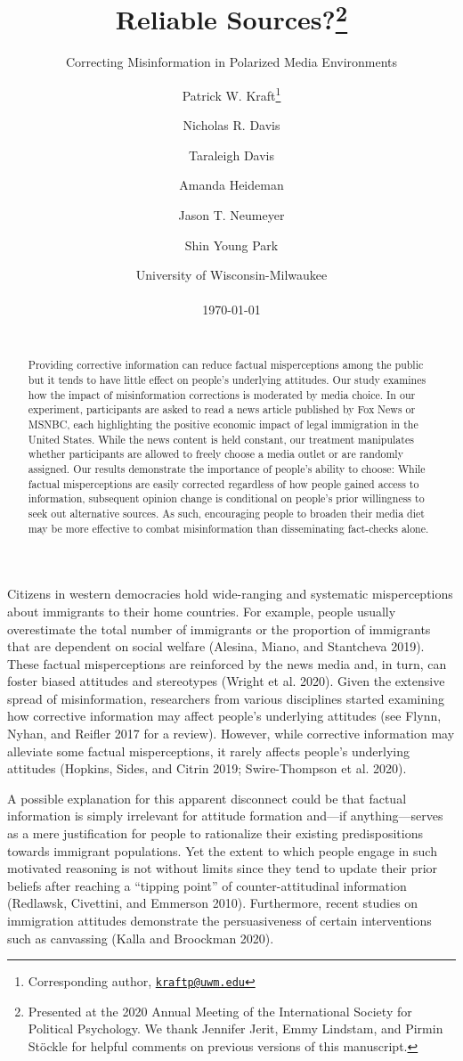 \documentclass[
  12pt,
]{article}
\title{Reliable Sources?\footnote{Presented at the 2020 Annual Meeting
  of the International Society for Political Psychology. We thank
  Jennifer Jerit, Emmy Lindstam, and Pirmin Stöckle for helpful comments
  on previous versions of this manuscript.}}
\subtitle{Correcting Misinformation in Polarized Media Environments
\vspace{1em}}
\author{Patrick W. Kraft\footnote{Corresponding author,
  \href{mailto:kraftp@uwm.edu}{\nolinkurl{kraftp@uwm.edu}}} \and Nicholas
R. Davis \and Taraleigh Davis \and Amanda Heideman \and Jason T.
Neumeyer \and Shin Young Park}
\date{\hfill\break
University of Wisconsin-Milwaukee\\
~\\
\today\\
~\\}
\begin{document}
\maketitle
\begin{abstract}
\noindent Providing corrective information can reduce factual
misperceptions among the public but it tends to have little effect on
people's underlying attitudes. Our study examines how the impact of
misinformation corrections is moderated by media choice. In our
experiment, participants are asked to read a news article published by
Fox News or MSNBC, each highlighting the positive economic impact of
legal immigration in the United States. While the news content is held
constant, our treatment manipulates whether participants are allowed to
freely choose a media outlet or are randomly assigned. Our results
demonstrate the importance of people's ability to choose: While factual
misperceptions are easily corrected regardless of how people gained
access to information, subsequent opinion change is conditional on
people's prior willingness to seek out alternative sources. As such,
encouraging people to broaden their media diet may be more effective to
combat misinformation than disseminating fact-checks alone.
\end{abstract}

\thispagestyle{empty}
\clearpage
\setcounter{page}{1}
\doublespace

\noindent Citizens in western democracies hold wide-ranging and
systematic misperceptions about immigrants to their home countries. For
example, people usually overestimate the total number of immigrants or
the proportion of immigrants that are dependent on social welfare
(Alesina, Miano, and Stantcheva 2019). These factual misperceptions are
reinforced by the news media and, in turn, can foster biased attitudes
and stereotypes (Wright et al. 2020). Given the extensive spread of
misinformation, researchers from various disciplines started examining
how corrective information may affect people's underlying attitudes (see
Flynn, Nyhan, and Reifler 2017 for a review). However, while corrective
information may alleviate some factual misperceptions, it rarely affects
people's underlying attitudes (Hopkins, Sides, and Citrin 2019;
Swire-Thompson et al. 2020).

A possible explanation for this apparent disconnect could be that
factual information is simply irrelevant for attitude formation and---if
anything---serves as a mere justification for people to rationalize
their existing predispositions towards immigrant populations. Yet the
extent to which people engage in such motivated reasoning is not without
limits since they tend to update their prior beliefs after reaching a
``tipping point'' of counter-attitudinal information (Redlawsk,
Civettini, and Emmerson 2010). Furthermore, recent studies on
immigration attitudes demonstrate the persuasiveness of certain
interventions such as canvassing (Kalla and Broockman 2020).
\end{document}
